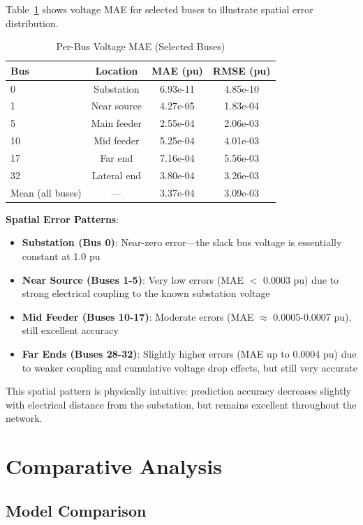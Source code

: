 \documentclass[12pt,a4paper]{report}
\begin{document}
Table~\ref{tab:perbus_accuracy} shows voltage MAE for selected buses to illustrate spatial error distribution.

\begin{table}[ht]
\centering
\caption{Per-Bus Voltage MAE (Selected Buses)}
\label{tab:perbus_accuracy}
\begin{tabular}{lccc}
\toprule
\textbf{Bus} & \textbf{Location} & \textbf{MAE (pu)} & \textbf{RMSE (pu)} \\
\midrule
0 & Substation & 6.93e-11 & 4.85e-10 \\
1 & Near source & 4.27e-05 & 1.83e-04 \\
5 & Main feeder & 2.55e-04 & 2.06e-03 \\
10 & Mid feeder & 5.25e-04 & 4.01e-03 \\
17 & Far end & 7.16e-04 & 5.56e-03 \\
32 & Lateral end & 3.80e-04 & 3.26e-03 \\
\midrule
Mean (all buses) & — & 3.37e-04 & 3.09e-03 \\
\bottomrule
\end{tabular}
\end{table}

\textbf{Spatial Error Patterns}:
\begin{itemize}
    \item \textbf{Substation (Bus 0)}: Near-zero error—the slack bus voltage is essentially constant at 1.0 pu
    \item \textbf{Near Source (Buses 1-5)}: Very low errors (MAE $<$ 0.0003 pu) due to strong electrical coupling to the known substation voltage
    \item \textbf{Mid Feeder (Buses 10-17)}: Moderate errors (MAE $\approx$ 0.0005-0.0007 pu), still excellent accuracy
    \item \textbf{Far Ends (Buses 28-32)}: Slightly higher errors (MAE up to 0.0004 pu) due to weaker coupling and cumulative voltage drop effects, but still very accurate
\end{itemize}

This spatial pattern is physically intuitive: prediction accuracy decreases slightly with electrical distance from the substation, but remains excellent throughout the network.

\section{Comparative Analysis}

\subsection{Model Comparison}
\end{document}
